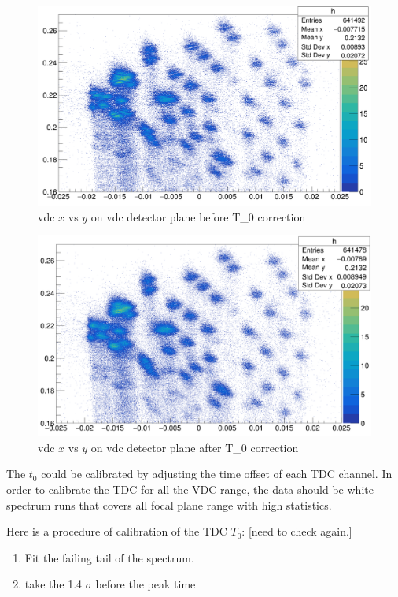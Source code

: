 \begin{figure}
    \centering
    \includegraphics[width=\textwidth]{images/chap3/vdc_t0_before_correction.png}
    \caption{vdc $x$ vs $y$ on vdc detector plane before T_0 correction}
    \label{fig:vdc_t0_before_correction}
\end{figure}


\begin{figure}
    \centering
    \includegraphics[width=\textwidth]{images/chap3/vdc_t0_after_correction.png}
    \caption{vdc $x$ vs $y$ on vdc detector plane after T_0 correction}
    \label{fig:vdc_t0_after_correction}
\end{figure}

The $t_0$ could be calibrated by adjusting the time offset of each TDC channel. In order to calibrate the TDC for all the VDC range, the data should be white spectrum runs that covers all focal plane range with high statistics. 

Here is a procedure of calibration of the TDC $T_0$: [need to check again.]
\begin{enumerate}
    \item Fit the failing tail of the spectrum. 
    \item take the 1.4 $\sigma$ before the peak time
\end{enumerate}


